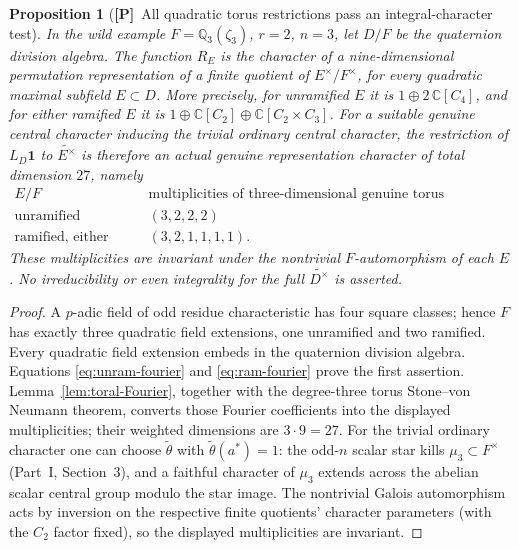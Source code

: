 \documentclass[11pt]{article}
\newcommand{\Ptag}{\textnormal{\textbf{[P]}}}
\theoremstyle{plain}
\newtheorem{proposition}[theorem]{Proposition}
\theoremstyle{definition}
\begin{document}
\begin{proposition}[\Ptag\ All quadratic torus restrictions pass
an integral-character test]\label{prop:all-three-tori}
In the wild example $F=\mathbb Q_3(\zeta_3)$, $r=2$, $n=3$,
let $D/F$ be the quaternion division algebra.  The function
$R_E$ is the character of a nine-dimensional permutation
representation of a finite quotient of $E^\times/F^\times$,
for every quadratic maximal subfield $E\subset D$.
More precisely, for unramified $E$ it is
$1\oplus 2\,\mathbb C[C_4]$, and for either ramified $E$
it is $1\oplus\mathbb C[C_2]\oplus\mathbb C[C_2\times C_3]$.
For a suitable genuine central character inducing the trivial
ordinary central character, the restriction of $L_D\mathbf1$
to $\widetilde{E^\times}$ is therefore an \emph{actual genuine
representation character} of total dimension $27$, namely
\[
 \begin{array}{c|c}
 E/F&\text{multiplicities of three-dimensional genuine torus irreducibles}\\\hline
 \text{unramified}&(3,2,2,2)\\
 \text{ramified, either type}&(3,2,1,1,1,1).
 \end{array}
\]
These multiplicities are invariant under the nontrivial
$F$-automorphism of each $E$.
\emph{No irreducibility or even integrality for the full
$\widetilde{D^\times}$ is asserted.}
\end{proposition}
\begin{proof}
A $p$-adic field of odd residue characteristic has four
square classes; hence $F$ has exactly three quadratic field
extensions, one unramified and two ramified.  Every quadratic
field extension embeds in the quaternion division algebra.
Equations \eqref{eq:unram-fourier} and \eqref{eq:ram-fourier}
prove the first assertion.  Lemma~\ref{lem:toral-Fourier},
together with the degree-three torus Stone--von Neumann theorem,
converts those Fourier coefficients into the displayed
multiplicities; their weighted dimensions are $3\cdot9=27$.
For the trivial ordinary character one can choose
$\widetilde\theta$ with $\widetilde\theta(a^*)=1$:
the odd-$n$ scalar star kills $\mu_3\subset F^\times$
(Part~I, Section~3), and a faithful character of
$\mu_3$ extends across the abelian scalar central group
modulo the star image.  The nontrivial Galois automorphism
acts by inversion on the respective finite quotients' character
parameters (with the $C_2$ factor fixed), so the displayed
multiplicities are invariant.
\end{proof}
\end{document}
